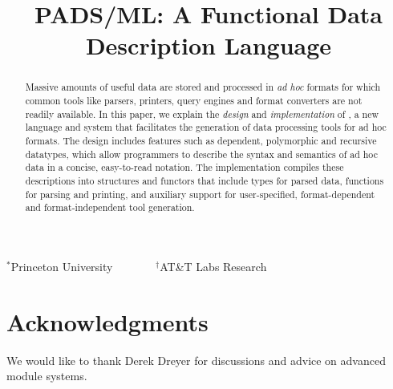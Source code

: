 \documentclass[nocopyrightspace]{sigplanconf}
\begin{document}
\title{PADS/ML: A Functional Data Description Language}
{$^\ast$Princeton University \ \ \ \ \ \ \ $^\dagger$AT\&T Labs Research}
 { \ \ \ \ }



\maketitle{}

\begin{abstract}  

  Massive amounts of useful data are stored and processed in
  \textit{ad hoc} formats for which common tools like parsers,
  printers, query engines and format converters are not readily 
  available.  In this paper,
  we explain the {\em design} and {\em implementation} of \padsml{},
  a new language and system that facilitates the
  generation of data processing tools for ad hoc formats.
  The \padsml{} design includes features such as
  dependent, polymorphic and recursive datatypes, which allow
  programmers to describe
  the syntax and semantics of ad hoc data in a concise,
  easy-to-read notation.
  The \padsml{} implementation compiles these descriptions
  into \ml{} structures and functors
  that include types for parsed data, functions for parsing
  and printing, and auxiliary support
  for user-specified, format-dependent and format-independent 
  tool generation.

\end{abstract}













\section*{Acknowledgments}

We would like to thank Derek Dreyer for discussions and advice on
advanced module systems.



%

%
\end{document}
